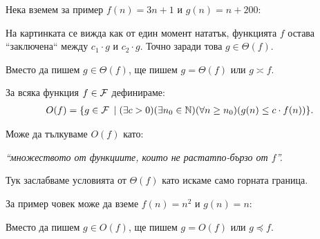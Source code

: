 Нека вземем за пример $f(n) = 3n + 1$ и $g(n) = n + 200$:


На картинката се вижда как от един момент нататък, функцията $f$ остава ``заключена`` между $c_1 \cdot g$ и $c_2 \cdot g$.
Точно заради това $g \in \Theta(f)$.
\begin{remark}
  Вместо да пишем $g \in \Theta(f)$, ще пишем $g = \Theta(f)$ или $g \asymp f$.
\end{remark}

\newpage

\begin{definition}
  За всяка функция $f \in \mathcal{F}$ дефинираме:
  \begin{align*}
    O(f) = \{ g \in \mathcal{F} \: \mid (\exists c > 0)(\exists n_0 \in \mathbb{N})(\forall n \geq n_0)(g(n) \leq c \cdot f(n))\}.
  \end{align*}
\end{definition}
Може да тълкуваме $O(f)$ като:
\begin{center}
  \textit{``множеството от функциите, които не растат\footnotemark[1] по-бързо от $f$''.}
\end{center}


Тук заслабваме условията от $\Theta(f)$ като искаме само горната граница.

За пример човек може да вземе $f(n) = n^2$ и $g(n) = n$:


\begin{remark}
  Вместо да пишем $g \in O(f)$, ще пишем $g = O(f)$ или $g \preceq f$.
\end{remark}

